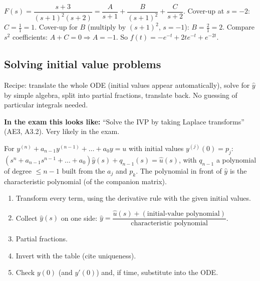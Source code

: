 \begin{workbox}[title={Worked example: repeated pole}]
$F(s)=\dfrac{s+3}{(s+1)^2(s+2)}=\dfrac{A}{s+1}+\dfrac{B}{(s+1)^2}+\dfrac{C}{s+2}$.
Cover-up at $s=-2$: $C=\frac{1}{1}=1$. Cover-up for $B$ (multiply by $(s+1)^2$, $s=-1$): $B=\frac{2}{1}=2$. Compare $s^2$ coefficients: $A+C=0\Rightarrow A=-1$.
So $f(t)=-e^{-t}+2te^{-t}+e^{-2t}$.
\end{workbox}

\subsection{Solving initial value problems \texorpdfstring{}{}}\label{sec:ivp}\label{ss:3-5}
\begin{plainbox}
Recipe: translate the whole ODE (initial values appear automatically), solve for $\hat y$ by simple algebra,
split into partial fractions, translate back. No guessing of particular integrals needed.
\par\smallskip\textbf{In the exam this looks like:} ``Solve the IVP by taking Laplace transforms'' (AE3, A3.2). Very likely in the exam.
\end{plainbox}
\begin{thmbox}[title={Proposition 0.30}]
For $y^{(n)}+a_{n-1}y^{(n-1)}+\dots+a_0y=u$ with initial values $y^{(j)}(0)=p_j$:
$(s^n+a_{n-1}s^{n-1}+\dots+a_0)\hat y(s)+q_{n-1}(s)=\hat u(s)$, with $q_{n-1}$ a polynomial of degree $\le n-1$ built from the $a_j$ and $p_k$.
The polynomial in front of $\hat y$ is the characteristic polynomial (of the companion matrix).
\end{thmbox}
\begin{methodbox}[title={Method: IVP by Laplace (5 steps)}]
\begin{enumerate}
\item Transform every term, using the derivative rule with the given initial values.
\item Collect $\hat y(s)$ on one side: $\hat y=\dfrac{\hat u(s)+(\text{initial-value polynomial})}{\text{characteristic polynomial}}$.
\item Partial fractions.
\item Invert with the table (cite uniqueness).
\item Check $y(0)$ (and $y'(0)$) and, if time, substitute into the ODE.
\end{enumerate}
\end{methodbox}


